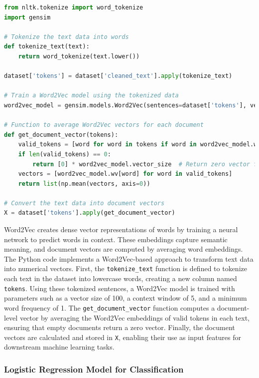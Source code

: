 \begin{tcolorbox}[colback=gray!5!white, colframe=gray!80!black, boxrule=0.5pt, title=Word2Vec]
\begin{lstlisting}[language=Python]
from nltk.tokenize import word_tokenize
import gensim

# Tokenize the text data into words
def tokenize_text(text):
    return word_tokenize(text.lower())

dataset['tokens'] = dataset['cleaned_text'].apply(tokenize_text)

# Train a Word2Vec model using the tokenized data
word2vec_model = gensim.models.Word2Vec(sentences=dataset['tokens'], vector_size=100, window=5, min_count=1, workers=4)

# Function to average Word2Vec vectors for each document
def get_document_vector(tokens):
    valid_tokens = [word for word in tokens if word in word2vec_model.wv]
    if len(valid_tokens) == 0:
        return [0] * word2vec_model.vector_size  # Return zero vector for empty documents
    vectors = [word2vec_model.wv[word] for word in valid_tokens]
    return list(np.mean(vectors, axis=0))

# Convert the text data into document vectors
X = dataset['tokens'].apply(get_document_vector)
\end{lstlisting}
\end{tcolorbox}

\noindent
Word2Vec creates dense vector representations of words by training a neural network to predict words in context. These embeddings capture semantic meaning, and document vectors are computed by averaging word embeddings. The Python code implements a Word2Vec-based approach to transform text data into numerical vectors. First, the \texttt{tokenize\_text} function is defined to tokenize each text in the dataset into lowercase words, creating a new column named \texttt{tokens}. Using these tokenized sentences, a Word2Vec model is trained with parameters such as a vector size of 100, a context window of 5, and a minimum word frequency of 1. The \texttt{get\_document\_vector} function computes a document-level vector by averaging the Word2Vec embeddings of valid tokens in each text, ensuring that empty documents return a zero vector. Finally, the document vectors are calculated and stored in \texttt{X}, enabling their use as input features for downstream machine learning tasks.


\subsubsection{Logistic Regression Model for Classification}

